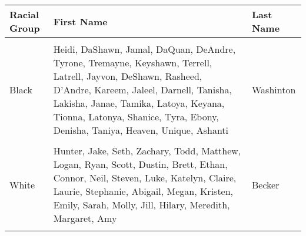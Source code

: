 \begin{table}
\centering
\begin{tabular}{p{}p{}p{}}
\hline
\textbf{Racial Group} & \textbf{First Name} & \textbf{Last Name} \\
 \hline \\
Black & Heidi, DaShawn, Jamal, DaQuan, DeAndre, Tyrone, Tremayne, Keyshawn, Terrell, Latrell, Jayvon, DeShawn, Rasheed, D'Andre, Kareem, Jaleel, Darnell, Tanisha, Lakisha, Janae, Tamika, Latoya, Keyana, Tionna, Latonya, Shanice, Tyra, Ebony, Denisha, Taniya, Heaven, Unique, Ashanti       & Washinton       \\\\
White & Hunter, Jake, Seth, Zachary, Todd, Matthew, Logan, Ryan, Scott, Dustin, Brett, Ethan, Connor, Neil, Steven, Luke, Katelyn, Claire, Laurie, Stephanie, Abigail, Megan, Kristen, Emily, Sarah, Molly, Jill, Hilary, Meredith, Margaret, Amy         & Becker            \\\\
\hline
\end{tabular}


\end{table}

